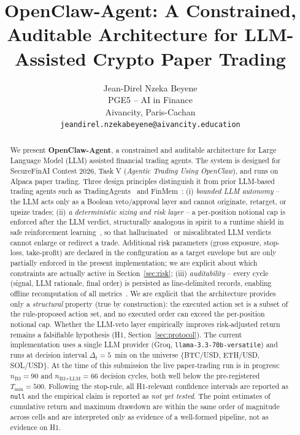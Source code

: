 \documentclass{article}
\title{OpenClaw-Agent: A Constrained, Auditable Architecture for LLM-Assisted Crypto Paper Trading}
\author{%
  Jean-Direl Nzeka Beyene \\
  PGE5 -- AI in Finance \\
  Aivancity, Paris-Cachan \\
  \texttt{jeandirel.nzekabeyene@aivancity.education} \\
}
\begin{document}
\maketitle

\begin{abstract}
We present \textbf{OpenClaw-Agent}, a constrained and auditable architecture for Large Language Model (LLM) assisted financial trading agents. The system is designed for SecureFinAI Contest 2026, Task V (\emph{Agentic Trading Using OpenClaw}), and runs on Alpaca paper trading. Three design principles distinguish it from prior LLM-based trading agents such as TradingAgents~\cite{tradingagents_xiao2024} and FinMem~\cite{finmem_yu2023}: (i) \emph{bounded LLM autonomy} -- the LLM acts only as a Boolean veto/approval layer and cannot originate, retarget, or upsize trades; (ii) \emph{a deterministic sizing and risk layer} -- a per-position notional cap is enforced after the LLM verdict, structurally analogous in spirit to a runtime shield in safe reinforcement learning~\cite{shielded_rl_alshiekh2018}, so that hallucinated~\cite{hallucination_survey_zhang2023} or miscalibrated LLM verdicts cannot enlarge or redirect a trade. Additional risk parameters (gross exposure, stop-loss, take-profit) are declared in the configuration as a target envelope but are only partially enforced in the present implementation; we are explicit about which constraints are actually active in Section~\ref{sec:risk}; (iii) \emph{auditability} -- every cycle (signal, LLM rationale, final order) is persisted as line-delimited records, enabling offline recomputation of all metrics~\cite{pineau_reproducibility2020}. We are explicit that the architecture provides only a \emph{structural} property (true by construction): the executed action set is a subset of the rule-proposed action set, and no executed order can exceed the per-position notional cap. Whether the LLM-veto layer empirically improves risk-adjusted return remains a falsifiable hypothesis (H1, Section~\ref{sec:protocol}). The current implementation uses a single LLM provider (Groq, \texttt{llama-3.3-70b-versatile}) and runs at decision interval $\Delta_t = 5$~min on the universe $\{$BTC/USD, ETH/USD, SOL/USD$\}$. At the time of this submission the live paper-trading run is in progress: $n_{\text{B3}}=90$ and $n_{\text{B3+LLM}}=66$ decision cycles, both well below the pre-registered $T_{\min}=500$. Following the stop-rule, all H1-relevant confidence intervals are reported as \texttt{null} and the empirical claim is reported as \emph{not yet tested}. The point estimates of cumulative return and maximum drawdown are within the same order of magnitude across cells and are interpreted only as evidence of a well-formed pipeline, not as evidence on H1.
\end{abstract}
\end{document}
